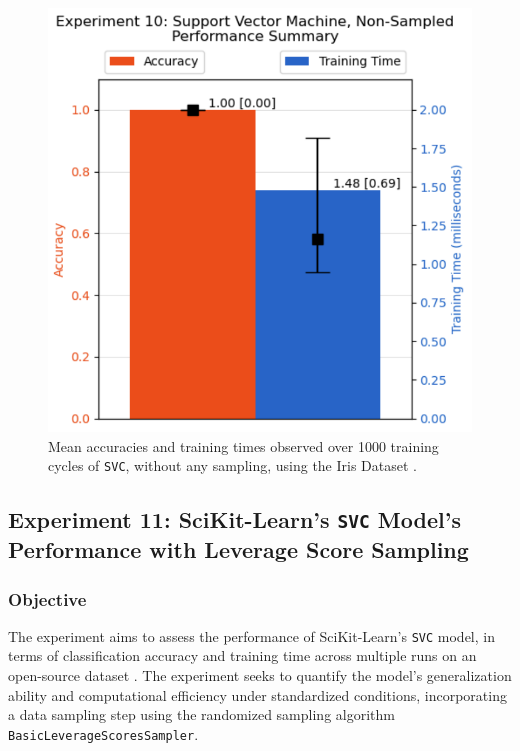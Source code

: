 \documentclass{article}
\theoremstyle{plain}
\theoremstyle{definition}
\theoremstyle{remark}
\begin{document}
\begin{figure}[ht]
	\vskip 0.2in
	\begin{center}
		\centerline{\includegraphics[width=\columnwidth]{experiment_10}}
		\caption{Mean accuracies and training times observed over 1000 training cycles of \texttt{SVC}, without any sampling, using the Iris Dataset \cite{iris}.}
		\label{experiment_10}
	\end{center}
	\vskip -0.2in
\end{figure}


\subsection{Experiment 11: SciKit-Learn's \texttt{SVC} Model's Performance with Leverage Score Sampling}

\subsubsection{Objective}

The experiment aims to assess the performance of SciKit-Learn's \texttt{SVC} model, in terms of classification accuracy and training time across multiple runs on an open-source dataset \cite{iris}. The experiment seeks to quantify the model's generalization ability and computational efficiency under standardized conditions, incorporating a data sampling step using the randomized sampling algorithm \texttt{BasicLeverageScoresSampler}.
\end{document}
